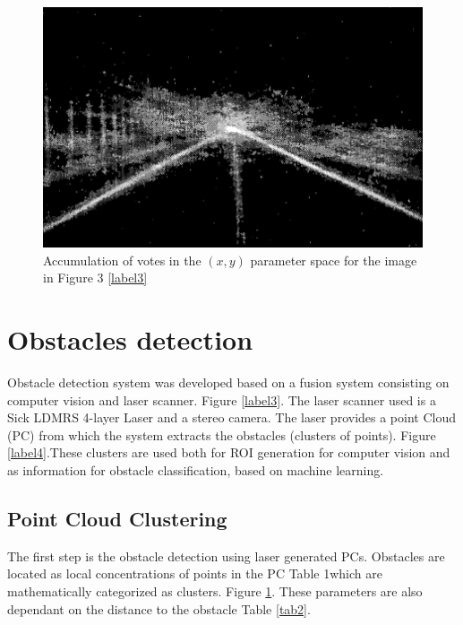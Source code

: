 \documentclass[12pt]{article}
\begin{document}
\begin{figure}
    \centering
    \includegraphics[width=0.75\linewidth]{image5.png}
    \caption{Accumulation of votes in the $(x, y)$ parameter space for the image in Figure 3 \ref{label3}}
    \label{label5}
\end{figure}

\newpage
\hspace{5mm}
\section {Obstacles detection} 

\raggedright Obstacle detection system was developed based on a fusion system consisting on computer vision and laser scanner. Figure \ref{label3}. The laser scanner used is a Sick LDMRS 4-layer Laser and a stereo camera. The laser provides a point Cloud (PC) from which the system extracts the obstacles (clusters of points). Figure \ref{label4}.These clusters are used both for ROI generation for computer vision and as information for obstacle classification, based on machine learning.


\hspace{5mm}
\subsection {Point Cloud Clustering} 

\raggedright The first step is the obstacle detection using laser generated PCs. Obstacles are located as local concentrations of points in the PC Table 1which are mathematically categorized as clusters. Figure \ref{label5}. These parameters are also dependant on the distance to the obstacle Table \ref{tab2}.
\end{document}
